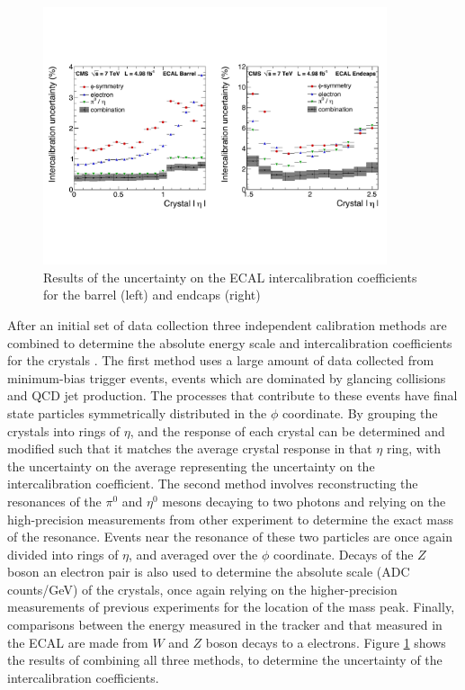 \begin{figure}[h]
   \centering
  \includegraphics[width=0.9\textwidth]{Figures/Reconstruction_Diagrams/ECAL_intercalibration_combined_methods.pdf}
  \caption{Results of the uncertainty on the ECAL intercalibration
    coefficients for the barrel (left) and endcaps (right)} \label{fig:ecal_intercal}
\end{figure}

\par After an initial set of data collection three independent
calibration methods are combined to determine the absolute energy
scale and intercalibration coefficients for the crystals
\cite{Chatrchyan:155414}.  The first method uses a large amount of
data collected from minimum-bias trigger events, events which are
dominated by glancing collisions and QCD jet production.  The
processes that contribute to these events have final state particles
symmetrically distributed in the $\phi$ coordinate.  By grouping the
crystals into rings of $\eta$, and the response of each crystal can be
determined and modified such that it matches the average crystal
response in that $\eta$ ring, with the uncertainty on the average
representing the uncertainty on the intercalibration coefficient.  The
second method involves reconstructing the resonances of the $\pi^{0}$
and $\eta^{0}$ mesons decaying to two photons and relying on the
high-precision measurements from other experiment to determine the
exact mass of the resonance.  Events near the resonance of these two
particles are once again divided into rings of $\eta$, and averaged
over the $\phi$ coordinate.  Decays of the $Z$ boson an electron pair
is also used to determine the absolute scale (ADC counts/GeV) of the
crystals, once again relying on the higher-precision measurements of
previous experiments for the location of the mass peak.  Finally,
comparisons between the energy measured in the tracker and that
measured in the ECAL are made from $W$ and $Z$ boson decays to a
electrons.  Figure \ref{fig:ecal_intercal} shows the results of
combining all three methods, to determine the uncertainty of the
intercalibration coefficients.  

